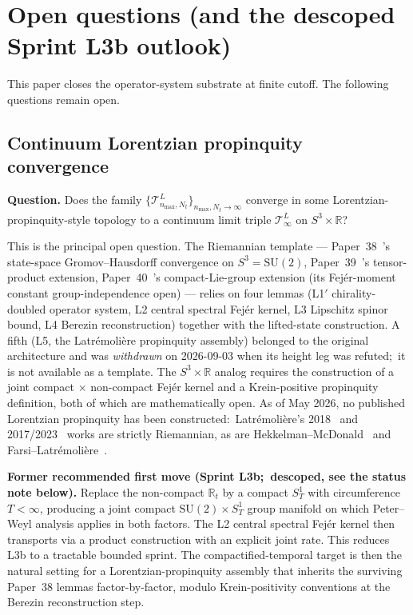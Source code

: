\documentclass[11pt,a4paper]{article}
\theoremstyle{plain}
\theoremstyle{definition}
\newcommand{\nmax}{n_{\max}}
\newcommand{\Nt}{N_t}
\newcommand{\sthree}{S^{3}}
\newcommand{\Tcal}{\mathcal{T}}
\newcommand{\R}{\mathbb{R}}
\newcommand{\SU}{\mathrm{SU}}
\begin{document}
\section{Open questions (and the descoped Sprint L3b outlook)}\label{sec:open}

This paper closes the operator-system substrate at finite cutoff. The
following questions remain open.

\subsection{Continuum Lorentzian propinquity convergence}
\label{sec:open_propinquity}

\textbf{Question.} Does the family
$\{\Tcal^L_{\nmax, \Nt}\}_{\nmax, \Nt \to \infty}$ converge in some
Lorentzian-propinquity-style topology to a continuum limit triple
$\Tcal^L_\infty$ on $\sthree \times \R$?

This is the principal open question. The Riemannian
template — Paper~38~\cite{paper38}'s state-space Gromov--Hausdorff
convergence on $\sthree = \SU(2)$, Paper~39~\cite{paper39}'s
tensor-product extension, Paper~40~\cite{paper40_unified}'s
compact-Lie-group extension (its Fej\'er-moment constant group-independence
open) — relies on
four lemmas (L1$'$ chirality-doubled operator system, L2 central
spectral Fejér kernel, L3 Lipschitz spinor bound, L4 Berezin
reconstruction) together with the lifted-state construction.  A fifth
(L5, the Latrémolière propinquity assembly) belonged to the original
architecture and was \emph{withdrawn} on 2026-09-03 when its height leg
was refuted;\ it is not available as a template. The
$\sthree \times \R$ analog requires the construction of a joint
compact $\times$ non-compact Fejér kernel and a Krein-positive
propinquity definition, both of which are mathematically open. As of May 2026,
no published Lorentzian propinquity has been constructed:\
Latr\'emoli\`ere's 2018~\cite{latremoliere2018} and
2017/2023~\cite{latremoliere_metric_st_2017} works are strictly
Riemannian, as are
Hekkelman--McDonald~\cite{hekkelman_mcdonald2024b} and
Farsi--Latr\'emoli\`ere~\cite{farsi_latremoliere2024,
farsi_latremoliere2025}.

\medskip\noindent
\textbf{Former recommended first move (Sprint L3b;\ descoped, see the
status note below).} Replace the non-compact
$\R_t$ by a compact $S^1_T$ with circumference $T < \infty$,
producing a joint compact $\SU(2) \times S^1_T$ group manifold on
which Peter--Weyl analysis applies in both factors. The L2 central
spectral Fejér kernel then transports via a product construction with
an explicit joint rate. This reduces L3b to a tractable bounded
sprint. The
compactified-temporal target is then the natural setting for a
Lorentzian-propinquity assembly that inherits the surviving Paper~38
lemmas factor-by-factor, modulo Krein-positivity conventions at the
Berezin reconstruction step.
\end{document}
